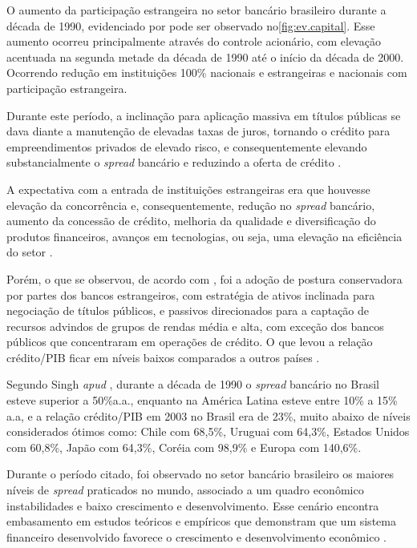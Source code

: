\documentclass[12pt,openright,oneside,a4paper,chapter=TITLE,section=TITLE,subsection=Title,english,french,spanish,portugues,sumario=tradicional]{04-class-files/abntex2}
\begin{document}
O aumento da participação estrangeira no setor bancário brasileiro durante a década de 1990, evidenciado por \textcite{camargo:2009} pode ser observado no\autoref{fig:ev.capital}. Esse aumento ocorreu principalmente através do controle acionário, com elevação acentuada na segunda metade da década de 1990 até o início da década de 2000. Ocorrendo redução em instituições 100\% nacionais e estrangeiras e nacionais com participação estrangeira.

Durante este período, a inclinação para aplicação massiva em títulos públicas se dava diante a manutenção de elevadas taxas de juros, tornando o crédito para empreendimentos privados de elevado risco, e consequentemente elevando substancialmente o \emph{spread} bancário e reduzindo a oferta de crédito \cite{camargo:2009}.

A expectativa com a entrada de instituições estrangeiras era que houvesse elevação da concorrência e, consequentemente, redução no \emph{spread} bancário, aumento da concessão de crédito, melhoria da qualidade e diversificação do produtos financeiros, avanços em tecnologias, ou seja, uma elevação na eficiência do setor \cite{camargo:2009}.

Porém, o que se observou, de acordo com \textcite{camargo:2009}, foi a adoção de postura conservadora por partes dos bancos estrangeiros, com estratégia de ativos inclinada para negociação de títulos públicos, e passivos direcionados para a captação de recursos advindos de grupos de rendas média e alta, com exceção dos bancos públicos que concentraram em operações de crédito. O que levou a relação crédito/PIB ficar em níveis baixos comparados a outros países \cite{camargo:2009, leal:2006}.

Segundo Singh \emph{apud} \textcite{leal:2006}, durante a década de 1990 o \emph{spread} bancário no Brasil esteve superior a 50\%a.a., enquanto na América Latina esteve entre 10\% a 15\% a.a, e a relação crédito/PIB em 2003 no Brasil era de 23\%, muito abaixo de níveis considerados ótimos como: Chile com 68,5\%, Uruguai com 64,3\%, Estados Unidos com 60,8\%, Japão com 64,3\%, Coréia com 98,9\% e Europa com 140,6\%.

Durante o período citado, foi observado no setor bancário brasileiro os maiores níveis de \emph{spread} praticados no mundo, associado a um quadro econômico instabilidades e baixo crescimento e desenvolvimento. Esse cenário encontra embasamento em estudos teóricos e empíricos que demonstram que um sistema financeiro desenvolvido favorece o crescimento e desenvolvimento econômico \cite{levine:1997, matos:2003}.
\end{document}
